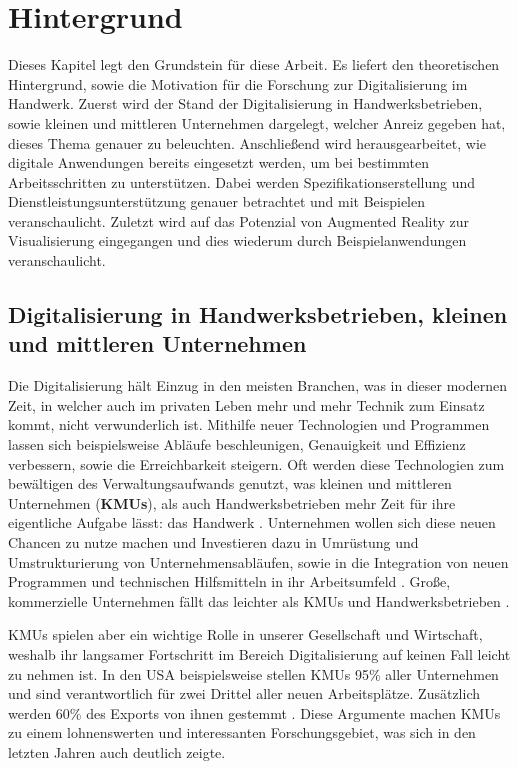 \chapter{Hintergrund}

Dieses Kapitel legt den Grundstein für diese Arbeit. Es liefert den theoretischen Hintergrund, sowie die Motivation für die Forschung zur Digitalisierung im Handwerk. Zuerst wird der Stand der Digitalisierung in Handwerksbetrieben, sowie kleinen und mittleren Unternehmen dargelegt, welcher Anreiz gegeben hat, dieses Thema genauer zu beleuchten. Anschließend wird herausgearbeitet, wie digitale Anwendungen bereits eingesetzt werden, um bei bestimmten Arbeitsschritten zu unterstützen. Dabei werden Spezifikationserstellung und Dienstleistungsunterstützung genauer betrachtet und mit Beispielen veranschaulicht. Zuletzt wird auf das Potenzial von Augmented Reality zur Visualisierung eingegangen und dies wiederum durch Beispielanwendungen veranschaulicht.

\section{Digitalisierung in Handwerksbetrieben, kleinen und mittleren Unternehmen}

Die Digitalisierung hält Einzug in den meisten Branchen, was in dieser modernen Zeit, in welcher auch im privaten Leben mehr und mehr Technik zum Einsatz kommt, nicht verwunderlich ist. Mithilfe neuer Technologien und Programmen lassen sich beispielsweise Abläufe beschleunigen, Genauigkeit und Effizienz verbessern, sowie die Erreichbarkeit steigern. Oft werden diese Technologien zum bewältigen des Verwaltungsaufwands genutzt, was kleinen und mittleren Unternehmen (\textbf{KMUs}), als auch Handwerksbetrieben mehr Zeit für ihre eigentliche Aufgabe lässt: das Handwerk \cite{noauthor_neue_nodate}. Unternehmen wollen sich diese neuen Chancen zu nutze machen und Investieren dazu in Umrüstung und Umstrukturierung von Unternehmensabläufen, sowie in die Integration von neuen Programmen und technischen Hilfsmitteln in ihr Arbeitsumfeld \cite{klinker_fliesen_2019}. Große, kommerzielle Unternehmen fällt das leichter als KMUs und Handwerksbetrieben \cite{hateful_six_krcmar}.

KMUs spielen aber ein wichtige Rolle in unserer Gesellschaft und Wirtschaft, weshalb ihr langsamer Fortschritt im Bereich Digitalisierung auf keinen Fall leicht zu nehmen ist. In den USA beispielsweise stellen KMUs 95\% aller Unternehmen und sind verantwortlich für zwei Drittel aller neuen Arbeitsplätze. Zusätzlich werden 60\% des Exports von ihnen gestemmt \cite{allocca_innovation_2006}. Diese Argumente machen KMUs zu einem lohnenswerten und interessanten Forschungsgebiet, was sich in den letzten Jahren auch deutlich zeigte.

